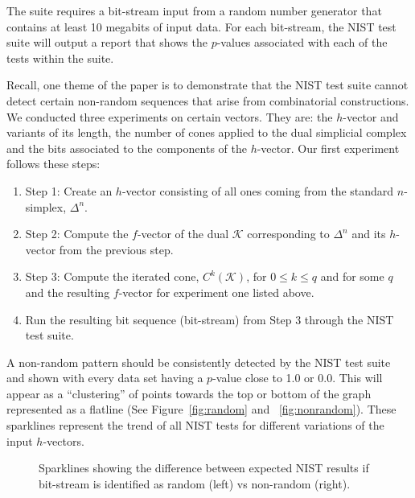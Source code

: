 \documentclass[oneside,12pt]{amsart}
\theoremstyle{definition}
\numberwithin{equation}{section}
\begin{document}
The suite requires a bit-stream input from a random number generator that contains at least 10 megabits of input data. For each bit-stream, the NIST test suite will output a report that shows the $p$-values associated with each of the tests within the suite.

Recall, one theme of the paper is to demonstrate that the NIST test suite cannot detect certain non-random sequences that arise from combinatorial constructions. We conducted three experiments on certain vectors.  They are: the $h$-vector and variants of its length, the number of cones applied to the dual simplicial complex and the bits associated to the components of the $h$-vector. Our first experiment follows these steps:

\begin{enumerate}
\item Step 1:  Create an $h$-vector consisting of all ones coming from the standard $n$-simplex, $\Delta^n$.
\item Step 2:  Compute the $f$-vector of the dual $\mathcal{K}$ corresponding to $\Delta^n$ and its $h$-vector from the previous step.
\item Step 3:  Compute the iterated cone, $C^k(\mathcal{K})$, for $ 0 \leq k \leq q$ and for some $q$ and the resulting $f$-vector for experiment one listed above.
\item Run the resulting bit sequence (bit-stream) from Step 3 through the NIST test suite.
\end{enumerate}



A non-random pattern should be consistently detected by the NIST test suite and shown with every data set having a $p$-value close to 1.0 or 0.0.  This will  appear as a ``clustering'' of points towards the top or bottom of the graph represented as a flatline (See Figure~\ref{fig:random} and ~\ref{fig:nonrandom}). These sparklines represent the trend of all NIST tests for different variations of the input $h$-vectors.

\begin{figure}[!htbp]
\centering
  \hfill
  \caption{Sparklines showing the difference between expected NIST results if bit-stream is identified as random (left) vs non-random (right).}
\end{figure}
\end{document}
